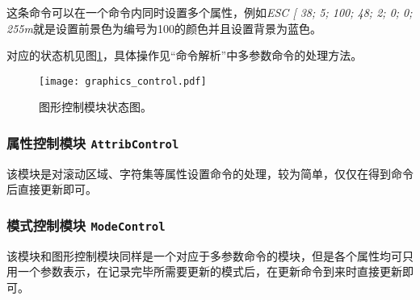 这条命令可以在一个命令内同时设置多个属性，例如{\it ESC [ 38; 5; 100; 48; 2; 0; 0; 255m}就是设置前景色为编号为100的颜色并且设置背景为蓝色。

	对应的状态机见图\ref{fig:graphics_control}，具体操作见``命令解析''中多参数命令的处理方法。
\begin{figure}[htbp]
\centerline{
\texttt{[image: graphics\_control.pdf]}
}
\label{fig:graphics_control}
\caption{图形控制模块状态图。}
\end{figure}
\subsubsection{属性控制模块 \texttt{AttribControl}}
该模块是对滚动区域、字符集等属性设置命令的处理，较为简单，仅仅在得到命令后直接更新即可。
\subsubsection{模式控制模块 \texttt{ModeControl}}
该模块和图形控制模块同样是一个对应于多参数命令的模块，但是各个属性均可只用一个参数表示，在记录完毕所需要更新的模式后，在更新命令到来时直接更新即可。
